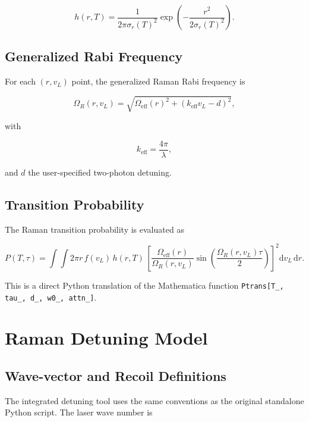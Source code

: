 \documentclass[11pt,a4paper]{article}
\begin{document}
\begin{equation}
h(r,T) = \frac{1}{2\pi \sigma_r(T)^2}
\exp\!\left(-\frac{r^2}{2\sigma_r(T)^2}\right).
\end{equation}

\subsection{Generalized Rabi Frequency}

For each $(r, v_L)$ point, the generalized Raman Rabi frequency is

\begin{equation}
\Omega_R(r,v_L) =
\sqrt{\Omega_{\mathrm{eff}}(r)^2 + \left(k_{\mathrm{eff}}v_L - d\right)^2},
\end{equation}

with

\begin{equation}
k_{\mathrm{eff}} = \frac{4\pi}{\lambda},
\end{equation}

and $d$ the user-specified two-photon detuning.

\subsection{Transition Probability}

The Raman transition probability is evaluated as

\begin{equation}
P(T,\tau)
=
\int \int
2\pi r \, f(v_L)\, h(r,T)\,
\left[
\frac{\Omega_{\mathrm{eff}}(r)}{\Omega_R(r,v_L)}
\sin\!\left(\frac{\Omega_R(r,v_L)\tau}{2}\right)
\right]^2
\mathrm{d}v_L\,\mathrm{d}r.
\end{equation}

This is a direct Python translation of the Mathematica function
\texttt{Ptrans[T\_, tau\_, d\_, w0\_, attn\_]}.

\section{Raman Detuning Model}

\subsection{Wave-vector and Recoil Definitions}

The integrated detuning tool uses the same conventions as the original standalone Python script.
The laser wave number is
\end{document}
